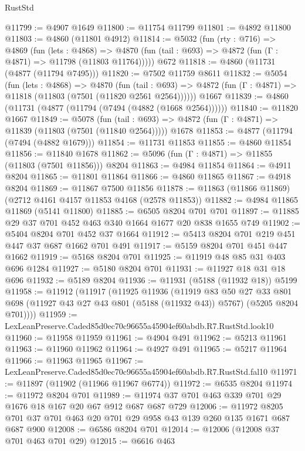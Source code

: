 \begin{lexlean}{RustStd}
\begin{coremodule}
@11799 := @4907 @1649
@11800 := @11754 @11799
@11801 := @4892 @11800
@11803 := @4860 (@11801 @4912)
@11814 := @5032
    (fun (rty : @716) =>
    @4869
      (fun (lets : @4868) =>
      @4870 (fun (tail : @693) => @4872 (fun (Γ : @4871) => @11798 (@11803 @11764)))))
    @672
@11818 := @4860 (@11731 (@4877 (@11794 @7495)))
@11820 := @7502 @11759 @8611
@11832 := @5054
    (fun (lets : @4868) =>
    @4870
      (fun (tail : @693) =>
      @4872 (fun (Γ : @4871) => @11818 (@11803 (@7501 (@11820 @2561 @2564))))))
    @1667
@11839 := @4860 (@11731 (@4877 (@11794 (@7494 (@4882 (@1668 @2564))))))
@11840 := @11820 @1667
@11849 := @5078
    (fun (tail : @693) => @4872 (fun (Γ : @4871) => @11839 (@11803 (@7501 (@11840 @2564)))))
    @1678
@11853 := @4877 (@11794 (@7494 (@4882 @1679)))
@11854 := @11731 @11853
@11855 := @4860 @11854
@11856 := @11840 @1678
@11862 := @5096 (fun (Γ : @4871) => @11855 (@11803 (@7501 @11856))) @8204
@11863 := @4984 @11854
@11864 := @4911 @8204
@11865 := @11801 @11864
@11866 := @4860 @11865
@11867 := @4918 @8204
@11869 := @11867 @7500 @11856
@11878 := @11863 (@11866 @11869) (@2712 @4161 @4157 @11853 @4168 (@2578 @11853))
@11882 := @4984 @11865 @11869 (@5141 @11800)
@11885 := @6505 @8204 @701 @701
@11897 := @11885 @29 @37 @701 @452 @463 @340 @1664 @1677 @20 @838 @1655 @749
@11902 := @5404 @8204 @701 @452 @37 @1664
@11912 := @5413 @8204 @701 @219 @451 @447 @37 @687 @1662 @701 @491
@11917 := @5159 @8204 @701 @451 @447 @1662
@11919 := @5168 @8204 @701
@11925 := @11919 @48 @85 @31 @403 @696 @1284
@11927 := @5180 @8204 @701
@11931 := @11927 @18 @31 @18 @696
@11932 := @5189 @8204
@11936 := @11931 (@5188 (@11932 @18)) @5199
@11958 := @11912
    (@11917
      (@11925
        @11936
        (@11919
          @83
          @50
          @27
          @33
          @801
          @698
          (@11927 @43 @27 @43 @801 (@5188 (@11932 @43)) @5767)
          (@5205 @8204 @701))))
@11959 := LexLeanPreserve.Caded85d0ec70c96655a45904ef60abdb.R7.RustStd.look10
@11960 := @11958 @11959
@11961 := @4904 @491
@11962 := @5213 @11961
@11963 := @11960 @11962
@11964 := @4927 @491
@11965 := @5217 @11964
@11966 := @11963 @11965
@11967 := LexLeanPreserve.Caded85d0ec70c96655a45904ef60abdb.R7.RustStd.fal10
@11971 := @11897 (@11902 (@11966 @11967 @6774))
@11972 := @6535 @8204
@11974 := @11972 @8204 @701
@11989 := @11974 @37 @701 @463 @339 @701 @29 @1676 @18 @167 @20 @67 @912 @687 @687 @729
@12006 := @11972 @8205 @701 @37 @701 @463 @20 @701 @29 @958 @43 @139 @260 @135 @1671 @687 @687 @900
@12008 := @6586 @8204 @701
@12014 := @12006 (@12008 @37 @701 @463 @701 @29)
@12015 := @6616 @463

\end{coremodule}
\end{lexlean}
